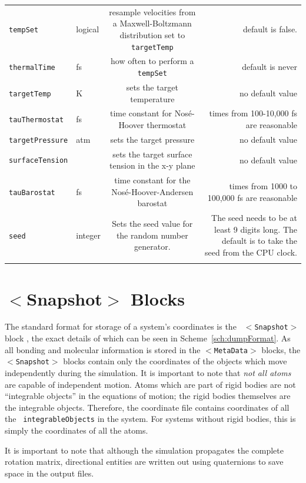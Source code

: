 \documentclass[]{book}
\begin{document}
\begin{longtable}[c]{ABCD}
{\tt tempSet} & logical & resample velocities from a Maxwell-Boltzmann
distribution set to {\tt targetTemp} & default is false. \\
{\tt thermalTime} & fs & how often to perform a {\tt tempSet} &
default is never \\
{\tt targetTemp} & K & sets the target temperature & no default value \\
{\tt tauThermostat} & fs & time constant for Nos\'{e}-Hoover
thermostat & times from 100-10,000 fs are reasonable \\
{\tt targetPressure} & atm & sets the target pressure & no default value\\
{\tt surfaceTension} &  & sets the target surface tension in the x-y
plane & no default value \\
{\tt tauBarostat} & fs & time constant for the
Nos\'{e}-Hoover-Andersen barostat & times from 1000 to 100,000 fs
are reasonable \\
{\tt seed } & integer & Sets the seed value for the random number generator. & The seed needs to be at least 9 digits long. The default is to take the seed from the CPU clock. \\
\label{table:genParams}
\end{longtable}


\section{\label{section:coordFiles}$<$Snapshot$>$ Blocks}

The standard format for storage of a system's coordinates is the {\tt
$<$Snapshot$>$} block , the exact details of which can be seen in
Scheme~\ref{sch:dumpFormat}. As all bonding and molecular information
is stored in the {\tt $<$MetaData$>$} blocks, the {\tt $<$Snapshot$>$} blocks
contain only the coordinates of the objects which move independently
during the simulation.  It is important to note that {\it not all
atoms} are capable of independent motion.  Atoms which are part of
rigid bodies are not ``integrable objects'' in the equations of
motion; the rigid bodies themselves are the integrable objects.
Therefore, the coordinate file contains coordinates of all the {\tt
integrableObjects} in the system.  For systems without rigid bodies,
this is simply the coordinates of all the atoms.

It is important to note that although the simulation propagates the
complete rotation matrix, directional entities are written out using
quaternions to save space in the output files.
\end{document}
